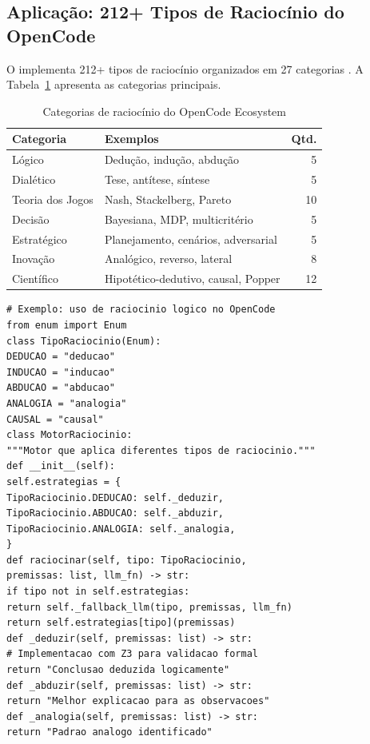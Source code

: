 \subsection{Aplicação: 212+ Tipos de Raciocínio do OpenCode}
O \opencodeeco{} implementa 212+ tipos de raciocínio organizados em 27
categorias \cite{opencode2026ecosystem}. A Tabela~\ref{tab:raciocinios}
apresenta as categorias principais.
\begin{table}[htb]
\centering
\caption{Categorias de raciocínio do OpenCode Ecosystem}
\label{tab:raciocinios}
\begin{tabular}{llr}
\toprule
\textbf{Categoria} & \textbf{Exemplos} & \textbf{Qtd.} \\
\midrule
Lógico & Dedução, indução, abdução & 5 \\
Dialético & Tese, antítese, síntese & 5 \\
Teoria dos Jogos & Nash, Stackelberg, Pareto & 10 \\
Decisão & Bayesiana, MDP, multicritério & 5 \\
Estratégico & Planejamento, cenários, adversarial & 5 \\
Inovação & Analógico, reverso, lateral & 8 \\
Científico & Hipotético-dedutivo, causal, Popper & 12 \\
\bottomrule
\end{tabular}
\end{table}
\begin{lstlisting}[style=pythonstyle]
# Exemplo: uso de raciocinio logico no OpenCode
from enum import Enum
class TipoRaciocinio(Enum):
DEDUCAO = "deducao"
INDUCAO = "inducao"
ABDUCAO = "abducao"
ANALOGIA = "analogia"
CAUSAL = "causal"
class MotorRaciocinio:
"""Motor que aplica diferentes tipos de raciocinio."""
def __init__(self):
self.estrategias = {
TipoRaciocinio.DEDUCAO: self._deduzir,
TipoRaciocinio.ABDUCAO: self._abduzir,
TipoRaciocinio.ANALOGIA: self._analogia,
}
def raciocinar(self, tipo: TipoRaciocinio,
premissas: list, llm_fn) -> str:
if tipo not in self.estrategias:
return self._fallback_llm(tipo, premissas, llm_fn)
return self.estrategias[tipo](premissas)
def _deduzir(self, premissas: list) -> str:
# Implementacao com Z3 para validacao formal
return "Conclusao deduzida logicamente"
def _abduzir(self, premissas: list) -> str:
return "Melhor explicacao para as observacoes"
def _analogia(self, premissas: list) -> str:
return "Padrao analogo identificado"
\end{lstlisting}

